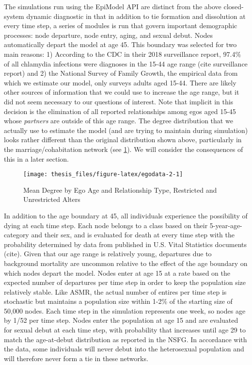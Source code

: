 \documentclass [11pt, proquest] {uwthesis}[2015/03/03]
\begin{document}
The simulations run using the EpiModel API are distinct from the above
closed-system dynamic diagnostic in that in addition to tie formation
and dissolution at every time step, a series of modules is run that
govern important demographic processes: node departure, node entry,
aging, and sexual debut. Nodes automatically depart the model at age 45.
This boundary was selected for two main reasons: 1) According to the CDC
in their 2018 surveillance report, 97.4\% of all chlamydia infections
were diagnoses in the 15-44 age range (cite surveillance report) and 2)
the National Survey of Family Growth, the empirical data from which we
estimate our model, only surveys adults aged 15-44. There are likely
other sources of information that we could use to increase the age
range, but it did not seem necessary to our questions of interest. Note
that implicit in this decision is the elimination of all reported
relationships among egos aged 15-45 whose \emph{partners} are outside of
this age range. The degree distribution that we actually use to estimate
the model (and are trying to maintain during simulation) looks rather
different than the original distribution shown above, particularly in
the marriage/cohabitation network (see \ref{fig:egodata-2}). We will
consider the consequences of this in a later section.
\begin{figure}

{\centering \texttt{[image: thesis\_files/figure-latex/egodata-2-1]} 

}

\caption{Mean Degree by Ego Age and Relationship Type, Restricted and Unrestricted Alters}\label{fig:egodata-2}
\end{figure}
In addition to the age boundary at 45, all individuals experience the
possibility of dying at each time step. Each node belongs to a class
based on their 5-year-age-category and their sex, and is evaluated for
death at every time step with the probability determined by data from
published in U.S. Vital Statistics documents (cite). Given that our age
range is relatively young, departures due to background mortality are
uncommon relative to the effect of the age boundary on which nodes
depart the model. Nodes enter at age 15 at a rate based on the expected
number of departures per time step in order to keep the population size
relatively stable. Like ASMR, the actual number of entires per time step
is stochastic but maintains a population size within 1-2\% of the
starting size of 50,000 nodes. Each time step in the simulation
represents one week, so nodes age by 1/52 per time step. Nodes enter the
population at age 15 and are evaluated for sexual debut at each time
step, with probability that increases until age 29 to match the
age-at-debut distribution as reported in the NSFG. In accordance with
the data, some individuals will never debut into the heterosexual
population and will therefore never form a tie in these networks.
\end{document}
